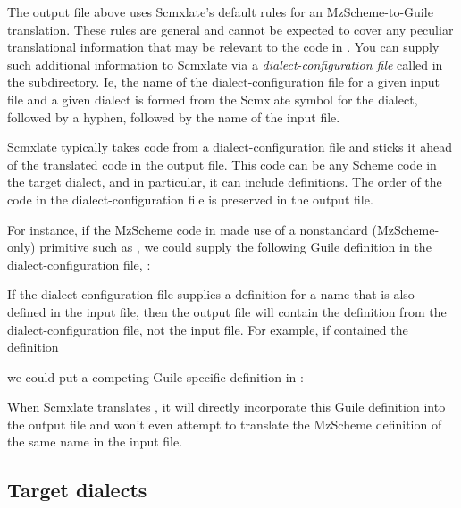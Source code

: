 The output  file  above uses Scmxlate's
default rules for an MzScheme-to-Guile translation.
These rules are general and cannot be expected to cover
any peculiar translational information that may be
relevant to the code in .  You can supply such
additional information to Scmxlate via a {\em
dialect-configuration file} called  in
the  subdirectory.   Ie, the name of
the dialect-configuration file for a given input file
and a given dialect is formed from  the Scmxlate symbol
for the dialect, followed by a hyphen, followed by the
name of the input file.

Scmxlate typically takes code from a
dialect-configuration file and sticks it  ahead of the
translated code in the output file.  This code can be
any Scheme code in the target dialect, and in
particular, it can include definitions.  The order of
the code in the dialect-configuration file is preserved
in the output file.

For instance, if the MzScheme code in  made
use of a nonstandard (MzScheme-only) primitive such as
, we could supply
the following Guile definition in the
dialect-configuration file,
:


If the dialect-configuration file supplies a definition for
a name that is also defined in the input file,
then the output file will contain the definition from
the dialect-configuration file, not the input file.
For example, if  contained
the definition


\n we could put a competing Guile-specific definition
in :


\n When Scmxlate translates , it will directly
incorporate this Guile definition into the output file
 and won't even attempt to translate
the MzScheme definition of the same name in the
input file.

\subsection{Target dialects}

